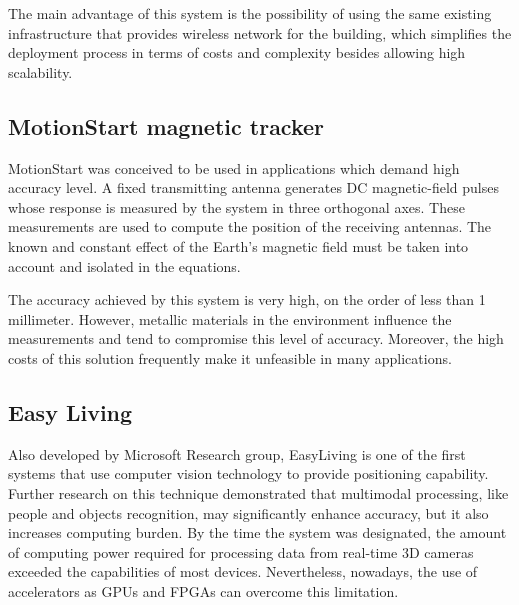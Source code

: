 The main advantage of this system is the possibility of using the same existing infrastructure that provides wireless network for the building, which simplifies the deployment process in terms of costs and complexity besides allowing high scalability.

\subsection{MotionStart magnetic tracker}
MotionStart \cite{motionStart} was conceived to be used in applications which demand high accuracy level. A fixed transmitting antenna generates DC magnetic-field pulses whose response is measured by the system in three orthogonal axes. These measurements are used to compute the position of the receiving antennas. The known and constant effect of the Earth's magnetic field must be taken into account and isolated in the equations.

The accuracy achieved by this system is very high, on the order of less than 1 millimeter. However, metallic materials in the environment influence the measurements and tend to compromise this level of accuracy. Moreover, the high costs of this solution frequently make it unfeasible in many applications.

\subsection{Easy Living}
Also developed by Microsoft Research group, EasyLiving \cite{easyLiving} is one of the first systems that use computer vision technology to provide positioning capability. Further research on this technique demonstrated that multimodal processing, like people and objects recognition, may significantly enhance accuracy, but it also increases computing burden. By the time the system was designated, the amount of computing power required for processing data from real-time 3D cameras exceeded the capabilities of most devices. Nevertheless, nowadays, the use of accelerators as GPUs and FPGAs can overcome this limitation.